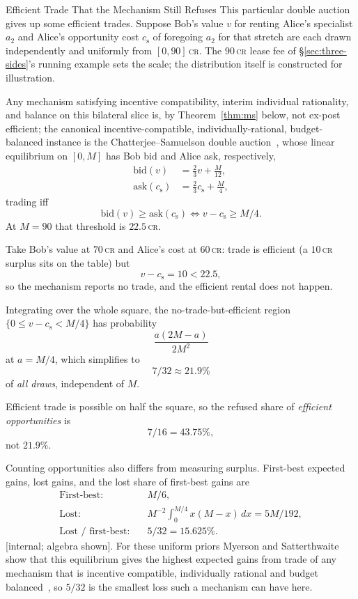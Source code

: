 \documentclass[11pt,a4paper]{article}
\theoremstyle{definition}
\theoremstyle{definition}
\theoremstyle{remark}
\begin{document}
\begin{pdexample}{Efficient Trade That the Mechanism Still Refuses}
\setlength{\parskip}{4pt plus 1pt}
This particular double auction gives up some efficient trades. Suppose Bob's value $v$ for renting
Alice's specialist $a_2$ and Alice's opportunity cost $c_{\mathrm s}$ of foregoing $a_2$ for
that stretch are each drawn independently and uniformly from $[0,90]$\,\textsc{cr}.
The $90$\,\textsc{cr} lease fee of \S\ref{sec:three-sides}'s running
example sets the scale; the distribution itself is constructed for illustration.

Any mechanism satisfying
incentive compatibility, interim individual rationality, and balance on this
bilateral slice is, by
Theorem~\ref{thm:ms} below, not ex-post efficient; the canonical incentive-compatible,
individually-rational, budget-balanced instance is the
Chatterjee--Samuelson double auction~, whose \mbox{linear}
equilibrium on $[0,M]$ has Bob bid and Alice ask, respectively,
\[
\begin{aligned}
\mathrm{bid}(v)&=\tfrac{2}{3}v+\tfrac{M}{12},\\
\mathrm{ask}(c_{\mathrm s})&=\tfrac{2}{3}c_{\mathrm s}+\tfrac{M}{4},
\end{aligned}
\]
trading iff
\[
\mathrm{bid}(v)\ge\mathrm{ask}(c_{\mathrm s}) \iff v-c_{\mathrm s}\ge M/4.
\]
At $M=90$ that threshold is $22.5$\,\textsc{cr}.

Take Bob's value
at $70$\,\textsc{cr} and Alice's cost at $60$\,\textsc{cr}: trade is efficient
(a $10$\,\textsc{cr} surplus sits on the table) but
\[
v-c_{\mathrm s}=10<22.5,
\]
so the mechanism reports no trade, and the efficient rental does not happen.

Integrating over the whole square, the no-trade-but-efficient region
$\{0\le v-c_{\mathrm s}<M/4\}$ has probability
\[
\dfrac{a(2M-a)}{2M^2}
\]
at $a=M/4$, which simplifies to
\[
7/32\approx21.9\%
\]
of \emph{all draws}, independent of $M$.

Efficient trade is possible on half the square, so the refused share of
\emph{efficient opportunities} is
\[
7/16=43.75\%,
\]
not $21.9\%$.

Counting opportunities also differs from measuring surplus. First-best
expected gains, lost gains, and the lost share of first-best gains are
\[
\begin{aligned}
\text{First-best:}\quad &M/6,\\
\text{Lost:}\quad &M^{-2}\int_0^{M/4}x(M-x)\,dx=5M/192,\\
\text{Lost / first-best:}\quad &5/32=15.625\%.
\end{aligned}
\]
[internal; algebra shown]. For these uniform priors Myerson and Satterthwaite
show that this equilibrium gives the highest expected gains from trade of any
mechanism that is incentive compatible, individually rational and budget
balanced~, so $5/32$ is the smallest loss such a mechanism
can have here.

\end{pdexample}
\end{document}

